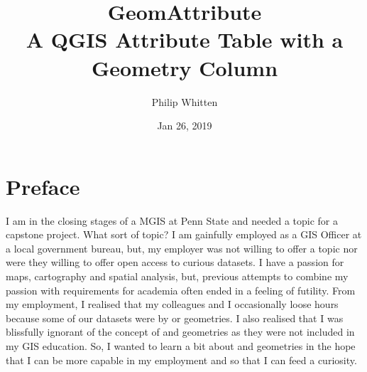 \documentclass[a4paper,11pt,english]{sphinxmanual}
\title{\Large GeomAttribute\\{\normalsize A QGIS Attribute Table with a Geometry Column}}
\date{Jan 26, 2019}
\author{Philip Whitten}
\begin{document}
\pagestyle{empty}
\newcommand\sphinxbackoftitlepage{\textbf{GeomAttribute: A QGIS Attribute Table with a Geometry Column} \par An Attribute Table with a geometry describing column that illuminates those geometries with {\textit{empty}} or {\textit{null}} values for the active vector layer in a QGIS workspace. \par This QGIS 3 plugin is licensed under the GNU General Public License v3.0. \par The plugin\textquotesingle s development repository is on Github: \url{https://github.com/PhilipWhitten/geomAttribute} \par The plugin can be downloaded from the QGIS repository: \url{http://plugins.qgis.org/plugins/geomAttribute} \par The help documentation is hosted online: \url{http://philipwhitten.github.io/geomAttribute} \par The initial version of the plugin was created in 2018 by Philip Whitten as part of a Penn State MGIS Capstone Project supervised by James O\textquotesingle Brien. \par Python scripts contained within this documentation were tested using the Sphinx doctest extension (\url{https://www.sphinx-doc.org/en/master/usage/extensions/doctest.html}) using a standard network installation of QGIS version 3.2.2 in a Microsoft Windows environment.}\sphinxmaketitle
\pagestyle{plain}
\sphinxtableofcontents
\pagestyle{normal}
\label{\detokenize{index_latex::doc}}



\chapter{Preface}
\label{\detokenize{preamble:preface}}\label{\detokenize{preamble::doc}}
I am in the closing stages of a MGIS at Penn State and needed a topic for a capstone project.  What sort of topic? I am gainfully employed as a GIS Officer at a local government bureau, but, my employer was not willing to offer a topic nor were they willing to offer open access to curious datasets.  I have a passion for maps, cartography and spatial analysis, but, previous attempts to combine my passion with requirements for academia often ended in a feeling of futility.  From my employment, I realised that my colleagues and I occasionally loose hours because some of our datasets were  by  or  geometries.  I also realised that I was blissfully ignorant of the concept of  and  geometries as they were not included in my GIS education.  So, I wanted to learn a bit about  and  geometries in the hope that I can be more capable in my employment and so that I can feed a curiosity.
\end{document}
